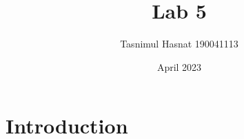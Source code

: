 \documentclass{article}
\title{Lab 5}
\author{Tasnimul Hasnat 190041113}
\date{April 2023}
\begin{document}
\maketitle

\section{Introduction}
\cite{blaschko2008learning}
\cite{bourdev2009poselets}
\cite{caffe2015models}
\cite{cai2015crossdepiction}
\cite{dalal2005histograms}
\cite{dean2013fast}
\cite{donahue2014decaf}
\cite{dong2014towards}
\cite{erhan2014scalable}
\cite{everingham2015pascal}
\cite{felzenszwalb2009object}
\cite{gidaris2015object}
\cite{ginosar2015detecting}
\cite{girshick2014rich}
\cite{girshick2015fast}
\cite{gould2009region}
\cite{hariharan2014simultaneous}
\cite{he2015spatial}
\cite{hinton2012improving}
\cite{hoffer2015deep}
\cite{hoiem2012diagnosing}
\cite{lenc2015r}
\cite{lienhart2002extended}
\cite{lowe1999object}
\cite{papageorgiou1998general}
\cite{rastegari2016xnor}
\cite{redmon2015real}
\cite{ren2015faster}
\cite{ren2016object}
\cite{russakovsky2015imagenet}
\cite{sadeghi201430hz}
\cite{sermanet2013overfeat}
\cite{shen2014more}
\cite{uijlings2013selective}
\cite{viola2001robust}
\cite{viola2004robust}
\cite{yan2014fastest}
\cite{yeager2015digits}
\cite{zitnick2014edge}



\end{document}
